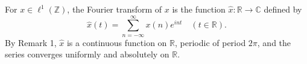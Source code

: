 For $x \in \ell^1(\mathbb{Z})$, the Fourier transform of $x$ is the function $\hat{x}: \mathbb{R} \to \mathbb{C}$ defined by
$$\hat{x}(t) = \sum_{n=-\infty}^{\infty} x(n) e^{int} \quad (t \in \mathbb{R}).$$
By Remark 1, $\hat{x}$ is a continuous function on $\mathbb{R}$, periodic of period $2\pi$, and the series converges uniformly and absolutely on $\mathbb{R}$.
